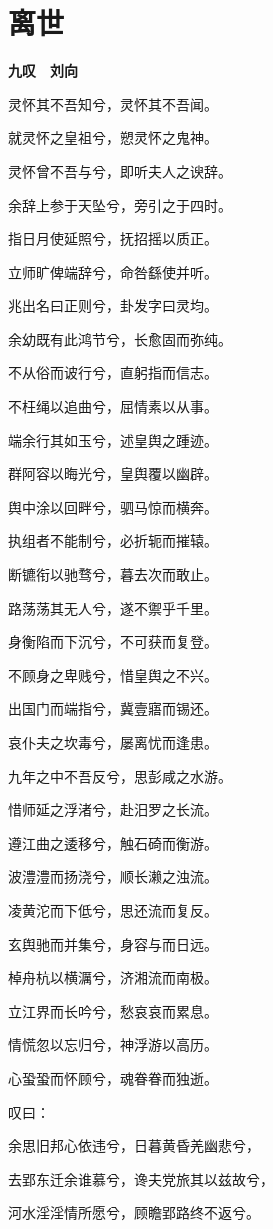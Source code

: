 \documentclass[12pt,a4paper]{ctexbook}
\begin{document}
\section{离世}
\textbf{九叹　刘向}\par\vspace{0.5em}
灵怀其不吾知兮，灵怀其不吾闻。\par
就灵怀之皇祖兮，愬灵怀之鬼神。\par
灵怀曾不吾与兮，即听夫人之谀辞。\par
余辞上参于天坠兮，旁引之于四时。\par
指日月使延照兮，抚招摇以质正。\par
立师旷俾端辞兮，命咎繇使并听。\par
兆出名曰正则兮，卦发字曰灵均。\par
余幼既有此鸿节兮，长愈固而弥纯。\par
不从俗而诐行兮，直躬指而信志。\par
不枉绳以追曲兮，屈情素以从事。\par
端余行其如玉兮，述皇舆之踵迹。\par
群阿容以晦光兮，皇舆覆以幽辟。\par
舆中涂以回畔兮，驷马惊而横奔。\par
执组者不能制兮，必折轭而摧辕。\par
断镳衔以驰骛兮，暮去次而敢止。\par
路荡荡其无人兮，遂不禦乎千里。\par
身衡陷而下沉兮，不可获而复登。\par
不顾身之卑贱兮，惜皇舆之不兴。\par
出国门而端指兮，冀壹寤而锡还。\par
哀仆夫之坎毒兮，屡离忧而逢患。\par
九年之中不吾反兮，思彭咸之水游。\par
惜师延之浮渚兮，赴汨罗之长流。\par
遵江曲之逶移兮，触石碕而衡游。\par
波澧澧而扬浇兮，顺长濑之浊流。\par
凌黄沱而下低兮，思还流而复反。\par
玄舆驰而并集兮，身容与而日远。\par
棹舟杭以横濿兮，济湘流而南极。\par
立江界而长吟兮，愁哀哀而累息。\par
情慌忽以忘归兮，神浮游以高历。\par
心蛩蛩而怀顾兮，魂眷眷而独逝。\par
叹曰：\par
余思旧邦心依违兮，日暮黄昏羌幽悲兮，\par
去郢东迁余谁慕兮，谗夫党旅其以兹故兮，\par
河水淫淫情所愿兮，顾瞻郢路终不返兮。\par
\end{document}
